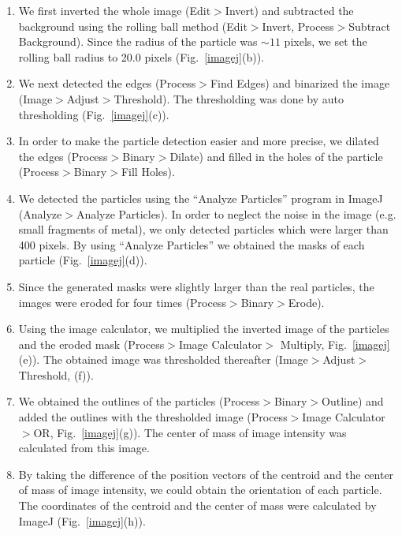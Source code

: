 \documentclass[%
 reprint,
 amsmath,amssymb,
 aps,
 floatfix
]{revtex4-2}
\begin{document}
\begin{enumerate}
    \item We first inverted the whole image (Edit$>$Invert) and subtracted the background using the rolling ball method (Edit$>$Invert, Process$>$Subtract Background).
    Since the radius of the particle was $\sim 11$ pixels, we set the rolling ball
    radius to 20.0 pixels (Fig.~\ref{imagej}(b)).
    
    \item We next detected the edges (Process$>$Find Edges) and binarized the image (Image$>$Adjust$>$Threshold). The thresholding was done by auto
    thresholding (Fig.~\ref{imagej}(c)).
    
    \item In order to make the particle detection easier and more precise, we dilated
    the edges (Process$>$Binary$>$Dilate) and filled in the holes of the particle (Process$>$Binary$>$Fill Holes).
    
    \item We detected the particles using the ``Analyze Particles'' program in ImageJ (Analyze$>$Analyze Particles).
    In order to neglect the noise in the image (e.g. small fragments of metal), we only
    detected particles which were larger than 400 pixels. By using ``Analyze Particles''
    we obtained the masks of each particle (Fig.~\ref{imagej}(d)).
    
    \item Since the generated masks were slightly larger than the real particles, the images were
    eroded for four times (Process$>$Binary$>$Erode).
    
    \item Using the image calculator, we multiplied the inverted image of the particles and the eroded mask (Process$>$Image Calculator$>$
    Multiply, Fig.~\ref{imagej}(e)). The obtained image was thresholded thereafter (Image$>$Adjust$>$Threshold, (f)).
    
    \item We obtained the outlines of the particles (Process$>$Binary$>$Outline) and added the outlines with the
    thresholded image (Process$>$Image Calculator$>$OR, Fig.~\ref{imagej}(g)). The center of mass of image intensity was calculated from this image.
    
    \item By taking the difference of the position vectors of the centroid and the center
    of mass of image intensity, we could obtain the orientation of each particle. The coordinates of the centroid and the center of mass were calculated by ImageJ (Fig.~\ref{imagej}(h)).
\end{enumerate}
\end{document}
